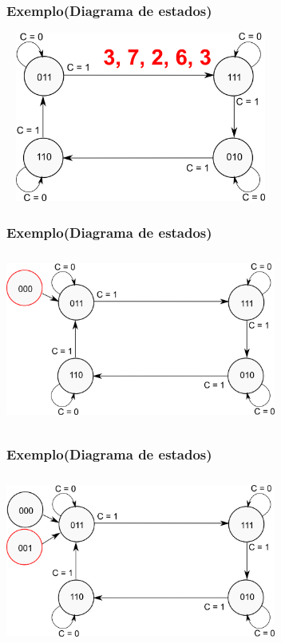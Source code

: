 \documentclass{beamer}
\begin{document}
\begin{frame}
  \frametitle{Exemplo(Diagrama de estados)}
  \begin{center}
    \includegraphics[height = 2.2in, width = 3.5in]{exemplo_projeto_5.png}
  \end{center}
\end{frame}

\begin{frame}
  \frametitle{Exemplo(Diagrama de estados)}
  \begin{center}
    \includegraphics[height = 2.2in, width = 3.5in]{exemplo_projeto_6.png}
  \end{center}
\end{frame}

\begin{frame}
  \frametitle{Exemplo(Diagrama de estados)}
  \begin{center}
    \includegraphics[height = 2.2in, width = 3.5in]{exemplo_projeto_7.png}
  \end{center}
\end{frame}
\end{document}

